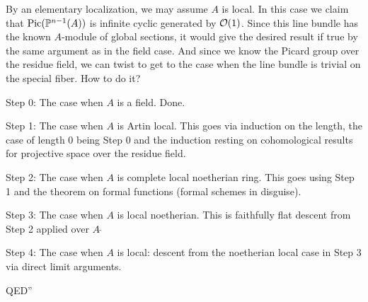 By an elementary localization, we may assume $A$ is local.
In this case we claim that $\mathrm{Pic}(\mathbb{P}^{n-1}(A))$ is infinite cyclic generated by $\mathcal{O}(1)$.
Since this line bundle has the known $A$-module of global sections,
it would give the desired result if true by the same argument as in the field case.
And since we know the Picard group over the residue field, we can twist
to get to the case when the line bundle is trivial on the special fiber. How to do it?

\medskip

 Step 0: The case when $A$ is a field. Done.

 \medskip

 Step 1: The case when $A$ is Artin local.
 This goes via induction on the length, the case of length $0$ being Step $0$
 and the induction resting on cohomological results for projective space over the residue field.

  \medskip

 Step 2: The case when $A$ is complete local noetherian ring. This goes
 using Step 1 and the theorem on formal functions (formal schemes in disguise).

  \medskip

 Step 3: The case when $A$ is local noetherian.
 This is faithfully flat descent from Step 2 applied over $A~\widehat{}$

 \medskip
 
 Step 4: The case when $A$ is local:
 descent from the noetherian local case in Step 3 via direct limit arguments.

\medskip
 
QED''
